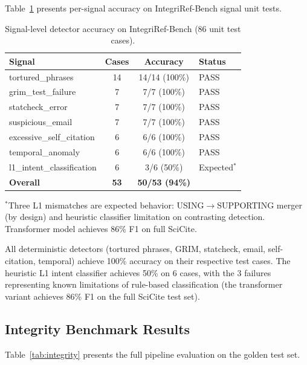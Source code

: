 \documentclass[sigconf,nonacm]{acmart}
\begin{document}
Table~\ref{tab:signal_results} presents per-signal accuracy on IntegriRef-Bench signal unit tests.

\begin{table}[t]
\caption{Signal-level detector accuracy on IntegriRef-Bench (86 unit test cases).}
\label{tab:signal_results}
\centering
\small
\begin{tabular}{lccl}
\toprule
\textbf{Signal} & \textbf{Cases} & \textbf{Accuracy} & \textbf{Status} \\
\midrule
tortured\_phrases         & 14 & 14/14 (100\%) & PASS \\
grim\_test\_failure       & 7  & 7/7 (100\%)   & PASS \\
statcheck\_error          & 7  & 7/7 (100\%)   & PASS \\
suspicious\_email         & 7  & 7/7 (100\%)   & PASS \\
excessive\_self\_citation & 6  & 6/6 (100\%)   & PASS \\
temporal\_anomaly         & 6  & 6/6 (100\%)   & PASS \\
l1\_intent\_classification & 6 & 3/6 (50\%)    & Expected$^*$ \\
\midrule
\textbf{Overall}          & \textbf{53} & \textbf{50/53 (94\%)} & \\
\bottomrule
\end{tabular}
\vspace{2pt}
{\footnotesize $^*$Three L1 mismatches are expected behavior: USING$\rightarrow$SUPPORTING merger (by design) and heuristic classifier limitation on contrasting detection. Transformer model achieves 86\% F1 on full SciCite.}
\end{table}

All deterministic detectors (tortured phrases, GRIM, statcheck, email, self-citation, temporal) achieve 100\% accuracy on their respective test cases.
The heuristic L1 intent classifier achieves 50\% on 6 cases, with the 3 failures representing known limitations of rule-based classification (the transformer variant achieves 86\% F1 on the full SciCite test set).

\subsection{Integrity Benchmark Results}

Table~\ref{tab:integrity} presents the full pipeline evaluation on the golden test set.
\end{document}
